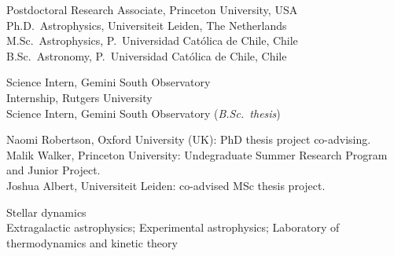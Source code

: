 \documentclass[11pt]{article}
\begin{document}

\noindent
{} Postdoctoral Research Associate, Princeton University, USA\\
 Ph.D.~Astrophysics, Universiteit Leiden, The Netherlands\\
 M.Sc.~Astrophysics, P.~Universidad Cat\'olica de Chile, Chile\\
 B.Sc.~Astronomy, P.~Universidad Cat\'olica de Chile, Chile



\noindent
{} Science Intern, Gemini South Observatory\\
 Internship, Rutgers University\\
 Science Intern, Gemini South Observatory (\emph{B.Sc.\ thesis})\\




\noindent
{} Naomi Robertson, Oxford University (UK): PhD thesis project co-advising.\\
 Malik Walker, Princeton University: Undegraduate Summer Research Program and Junior Project.\\
 Joshua Albert, Universiteit Leiden: co-advised MSc thesis project. 


\noindent
{} Stellar dynamics\\
 Extragalactic astrophysics; Experimental astrophysics; Laboratory of thermodynamics and kinetic theory\\


\pagebreak
\end{document}
